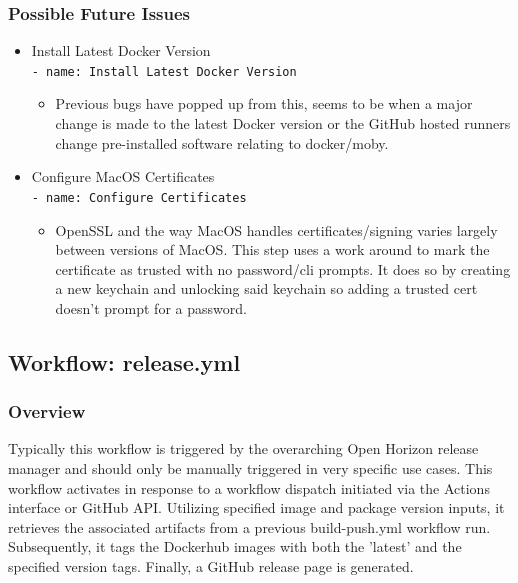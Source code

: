 \documentclass[a4paper,11pt]{article}
\begin{document}
\subsubsection{Possible Future Issues}
\begin{itemize}

    \item Install Latest Docker Version\\\verb|- name: Install Latest Docker Version|
    \begin{itemize}
        \item Previous bugs have popped up from this, seems to be when a major change is made to the latest Docker version or the GitHub hosted runners change pre-installed software relating to docker/moby.
    \end{itemize}

    \item Configure MacOS Certificates\\\verb|- name: Configure Certificates|
    \begin{itemize}
        \item OpenSSL and the way MacOS handles certificates/signing varies largely between versions of MacOS. This step uses a work around to mark the certificate as trusted with no password/cli prompts. It does so by creating a new keychain and unlocking said keychain so adding a trusted cert doesn't prompt for a password.
    \end{itemize}
\end{itemize}


\newpage
\subsection{Workflow: release.yml}

\subsubsection{Overview}
Typically this workflow is triggered by the overarching Open Horizon release manager and should only be manually triggered in very specific use cases. This workflow activates in response to a workflow dispatch initiated via the Actions interface or GitHub API. Utilizing specified image and package version inputs, it retrieves the associated artifacts from a previous build-push.yml workflow run. Subsequently, it tags the Dockerhub images with both the 'latest' and the specified version tags. Finally, a GitHub release page is generated.
\end{document}
